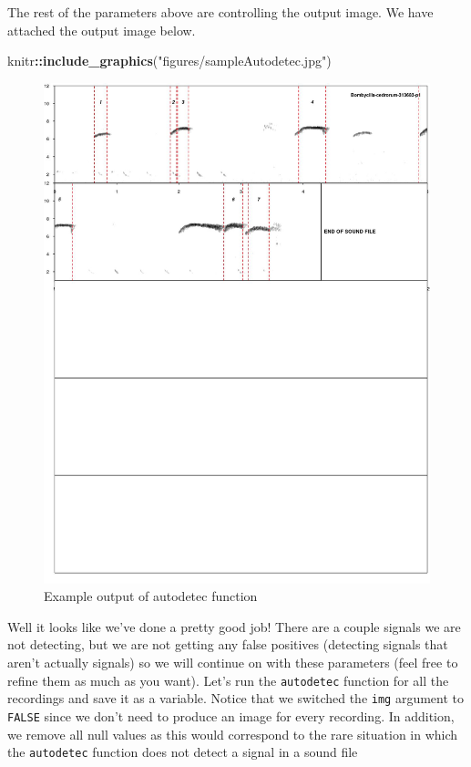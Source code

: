 \documentclass[
]{krantz}
\makeatletter
\newenvironment{Shaded}{\begin{snugshade}}{\end{snugshade}}
\newcommand{\KeywordTok}[1]{\textcolor[rgb]{0.27,0.27,0.27}{\textbf{#1}}}
\newcommand{\NormalTok}[1]{#1}
\newcommand{\OperatorTok}[1]{\textcolor[rgb]{0.43,0.43,0.43}{\textbf{#1}}}
\newcommand{\StringTok}[1]{\textcolor[rgb]{0.5,0.5,0.5}{#1}}
\newenvironment{kframe}{%
\medskip{}
\setlength{\fboxsep}{.8em}
 \def\at@end@of@kframe{}%
 \ifinner\ifhmode%
  \def\at@end@of@kframe{\end{minipage}}%
  \begin{minipage}{\columnwidth}%
 \fi\fi%
 \def\FrameCommand##1{\hskip\@totalleftmargin \hskip-\fboxsep
 \colorbox{shadecolor}{##1}\hskip-\fboxsep
     \hskip-\linewidth \hskip-\@totalleftmargin \hskip\columnwidth}%
 \MakeFramed {\advance\hsize-\width
   \@totalleftmargin\z@ \linewidth\hsize
   \@setminipage}}%
 {\par\unskip\endMakeFramed%
 \at@end@of@kframe}
\renewenvironment{Shaded}{\begin{kframe}}{\end{kframe}}
\makeatother
\begin{document}
The rest of the parameters above are controlling the output image. We have attached the output image below.

\begin{Shaded}
\begin{Highlighting}[]
\NormalTok{knitr}\OperatorTok{::}\KeywordTok{include\_graphics}\NormalTok{(}\StringTok{"figures/sampleAutodetec.jpg"}\NormalTok{) }
\end{Highlighting}
\end{Shaded}

\begin{figure}
\includegraphics[width=18.89in]{figures/sampleAutodetec} \caption{Example output of autodetec function}\label{fig:autodetec}
\end{figure}

Well it looks like we've done a pretty good job! There are a couple signals we are not detecting, but we are not getting any false positives (detecting signals that aren't actually signals) so we will continue on with these parameters (feel free to refine them as much as you want). Let's run the \texttt{autodetec} function for all the recordings and save it as a variable. Notice that we switched the \texttt{img} argument to \texttt{FALSE} since we don't need to produce an image for every recording. In addition, we remove all null values as this would correspond to the rare situation in which the \texttt{autodetec} function does not detect a signal in a sound file
\end{document}
